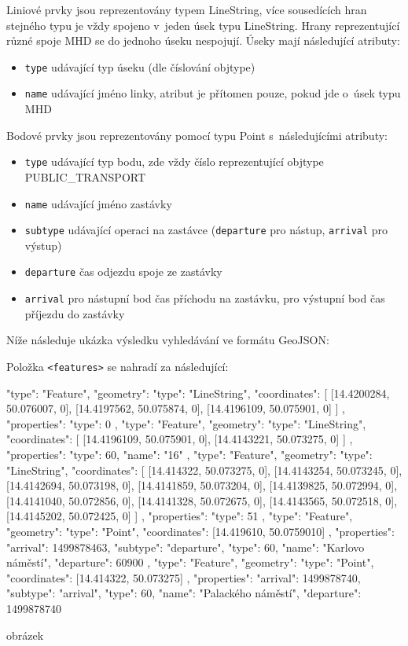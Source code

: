 Liniové prvky jsou reprezentovány typem LineString, více sousedících hran
stejného typu je vždy spojeno v~jeden úsek typu LineString. Hrany reprezentující různé
spoje MHD se do jednoho úseku nespojují. Úseky mají následující atributy: 
\begin{itemize}
	\item {\tt type} udávající typ úseku (dle číslování objtype)
	\item {\tt name} udávající jméno linky, atribut je přítomen pouze, pokud
	jde o~úsek typu MHD
\end{itemize}
Bodové prvky jsou reprezentovány pomocí typu Point s~následujícími atributy: 
\begin{itemize}
	\item {\tt type} udávající typ bodu, zde vždy číslo reprezentující objtype PUBLIC\_TRANSPORT  	
	\item {\tt name} udávající jméno zastávky
	\item {\tt subtype} udávající operaci na zastávce ({\tt departure} pro
	nástup, {\tt arrival} pro výstup)
	\item {\tt departure} čas odjezdu spoje ze zastávky
	\item {\tt arrival} pro nástupní bod čas příchodu na zastávku, pro
	výstupní bod čas příjezdu do zastávky
\end{itemize}
Níže následuje ukázka výsledku vyhledávání ve formátu GeoJSON:
\begin{code}
\end{code}

Položka {\tt <features>} se nahradí za následující:
\begin{code}
{
	"type": "Feature",
	"geometry":
	{
		"type": "LineString",
		"coordinates":
		[
			[14.4200284, 50.076007, 0], 
			[14.4197562, 50.075874, 0], 
			[14.4196109, 50.075901, 0]
		]
	}, 
	"properties": {"type": 0}
}, 
{
	"type": "Feature",
	"geometry": 
	{
		"type": "LineString",
		"coordinates":
		[
			[14.4196109, 50.075901, 0],
			[14.4143221, 50.073275, 0]
		]
	},
	"properties": {"type": 60, "name": "16"}
}, {
	"type": "Feature",
	"geometry": 
	{
		"type": "LineString",
		"coordinates":
		[
			[14.414322, 50.073275, 0],
			[14.4143254, 50.073245, 0],
			[14.4142694, 50.073198, 0],
			[14.4141859, 50.073204, 0],
			[14.4139825, 50.072994, 0],
			[14.4141040, 50.072856, 0],
			[14.4141328, 50.072675, 0],
			[14.4143565, 50.072518, 0],
			[14.4145202, 50.072425, 0]
		]
	},
	"properties": {"type": 51}
}, {
	"type": "Feature",
	"geometry":
	{
		"type": "Point", 
		"coordinates": [14.419610, 50.0759010]
	},
	"properties": 
	{
		"arrival": 1499878463, 
		"subtype": "departure", 
		"type": 60, 
		"name": "Karlovo náměstí",
		"departure": 60900
	}
}, {
	"type": "Feature",
	"geometry":
	{
		"type": "Point",
		"coordinates": [14.414322, 50.073275]
	},
	"properties": 
	{
		"arrival": 1499878740,
		"subtype": "arrival",
		"type": 60,
		"name": "Palackého náměstí",
		"departure": 1499878740
	}
}
\end{code}
\TODO obrázek
